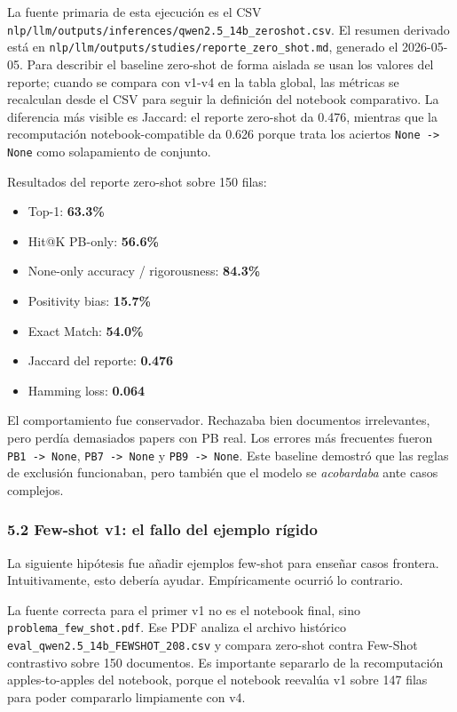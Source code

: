 La fuente primaria de esta ejecución es el CSV \texttt{nlp/llm/outputs/inferences/qwen2.5\_14b\_zeroshot.csv}. El resumen derivado está en \texttt{nlp/llm/outputs/studies/reporte\_zero\_shot.md}, generado el 2026-05-05. Para describir el baseline zero-shot de forma aislada se usan los valores del reporte; cuando se compara con v1-v4 en la tabla global, las métricas se recalculan desde el CSV para seguir la definición del notebook comparativo. La diferencia más visible es Jaccard: el reporte zero-shot da 0.476, mientras que la recomputación notebook-compatible da 0.626 porque trata los aciertos \texttt{None -> None} como solapamiento de conjunto.

Resultados del reporte zero-shot sobre 150 filas:

\begin{itemize}
\item Top-1: \textbf{63.3\%}
\item Hit@K PB-only: \textbf{56.6\%}
\item None-only accuracy / rigorousness: \textbf{84.3\%}
\item Positivity bias: \textbf{15.7\%}
\item Exact Match: \textbf{54.0\%}
\item Jaccard del reporte: \textbf{0.476}
\item Hamming loss: \textbf{0.064}
\end{itemize}

El comportamiento fue conservador. Rechazaba bien documentos irrelevantes, pero perdía demasiados papers con PB real. Los errores más frecuentes fueron \texttt{PB1 -> None}, \texttt{PB7 -> None} y \texttt{PB9 -> None}. Este baseline demostró que las reglas de exclusión funcionaban, pero también que el modelo se \emph{acobardaba} ante casos complejos.

\subsubsection{5.2 Few-shot v1: el fallo del ejemplo rígido}

La siguiente hipótesis fue añadir ejemplos few-shot para enseñar casos frontera. Intuitivamente, esto debería ayudar. Empíricamente ocurrió lo contrario.

La fuente correcta para el primer v1 no es el notebook final, sino \texttt{problema\_few\_shot.pdf}. Ese PDF analiza el archivo histórico \texttt{eval\_qwen2.5\_14b\_FEWSHOT\_208.csv} y compara zero-shot contra Few-Shot contrastivo sobre 150 documentos. Es importante separarlo de la recomputación apples-to-apples del notebook, porque el notebook reevalúa v1 sobre 147 filas para poder compararlo limpiamente con v4.


